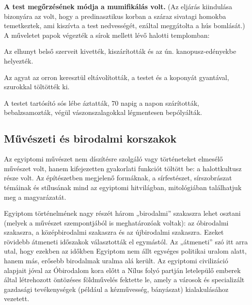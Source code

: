 	\textbf{A test megőrzésének módja a mumifikálás volt.} (Az eljárás kiindulása bizonyára az volt, hogy a predinasztikus korban a száraz sivatagi homokba temetkeztek, ami kiszívta a test nedvességét, ezáltal meggátolta a hús bomlását.) A műveletet papok végezték a sírok mellett lévő halotti templomban:
	\begin{compactitem}
		\item Az elhunyt belső szerveit kivették, kiszárították és az ún. kanopusz-edényekbe helyezték.
		\item Az agyat az orron keresztül eltávolították, a testet és a koponyát gyantával, szurokkal töltötték ki.
		\item A testet tartósító sós lébe áztatták, 70 napig a napon szárították, bebalzsamozták, végül vászonszalagokkal légmentesen bepólyálták.
	\end{compactitem}

\begin{figure}[!h]
	\begin{minipage}{0.49\textwidth}
		\centering
	\end{minipage}\hfill
	\begin{minipage}{0.45\textwidth}
		\centering
	\end{minipage}\hfill
	\captionsetup{labelformat=empty}
	\caption{}
\end{figure}

	

\subsection*{Művészeti és birodalmi korszakok}

	Az egyiptomi művészet nem díszítésre szolgáló vagy történeteket elmesélő művészet volt, hanem kifejezetten gyakorlati funkciót töltött be: a halottkultusz része volt. Az építészetben megjelenő formáknak, a sírfestészet, sírszobrászat témáinak és stílusának mind az egyiptomi hitvilágban, mitológiában találhatjuk meg a magyarázatát.

Egyiptom történelmének nagy részét három „birodalmi” szakaszra lehet osztani (melyek a művészet szempontjából is meghatározóak voltak): az óbirodalmi szakaszra, a középbirodalmi szakaszra és az újbirodalmi szakaszra. Ezeket rövidebb átmeneti időszakok választották el egymástól. Az „átmeneti” szó itt arra utal, hogy ezekben az időkben Egyiptom nem állt egységes politikai uralom alatt, hanem más, erősebb birodalmak uralma alá került. Az egyiptomi civilizáció alapjait jóval az Óbirodalom kora előtt a Nílus folyó partján letelepülő emberek által létrehozott öntözéses földművelés fektette le, amely a városok és specializált gazdasági tevékenységek (például a kézművesség, bányászat) kialakulásához vezetett.


